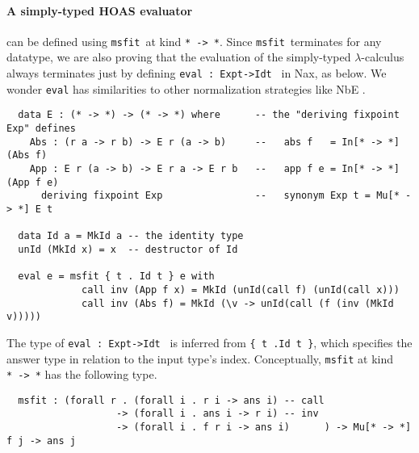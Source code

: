 \documentclass[a4paper]{easychair} %
\newcommand{\msfit}[0]{\texttt{msfit}}
\begin{document}
\paragraph{A simply-typed HOAS evaluator\!\!\!} can be defined
using \msfit\ at kind \texttt{*\,->\,*}.  Since \msfit\ terminates
for any datatype, we are also proving that the evaluation of
the simply-typed $\lambda$-calculus always terminates
just by defining \texttt{eval\,:\,Exp\;t\;->\;Id\;t\,} in Nax, as below.
We wonder \texttt{eval} has similarities to other normalization strategies
like NbE \cite{BerSch91}.
\vspace*{-1ex}
{\small
\begin{verbatim}
  data E : (* -> *) -> (* -> *) where      -- the "deriving fixpoint Exp" defines
    Abs : (r a -> r b) -> E r (a -> b)     --   abs f   = In[* -> *] (Abs f)
    App : E r (a -> b) -> E r a -> E r b   --   app f e = In[* -> *] (App f e)
      deriving fixpoint Exp                --   synonym Exp t = Mu[* -> *] E t

  data Id a = MkId a -- the identity type
  unId (MkId x) = x  -- destructor of Id
  
  eval e = msfit { t . Id t } e with
             call inv (App f x) = MkId (unId(call f) (unId(call x)))
             call inv (Abs f) = MkId (\v -> unId(call (f (inv (MkId v)))))
\end{verbatim} }
\vspace*{-.5ex}\noindent
The type of \texttt{eval\,:\,Exp\;t\;->\;Id\;t\,} is inferred from
\texttt{\{\,t\,.\;Id t\,\}}, which specifies the answer type in relation
to the input type's index.
Conceptually, \texttt{msfit} at kind \texttt{*\,->\,*} has the following type.\vspace*{-.5ex}
{\small
\begin{verbatim}
  msfit : (forall r . (forall i . r i -> ans i) -- call
                   -> (forall i . ans i -> r i) -- inv
                   -> (forall i . f r i -> ans i)      ) -> Mu[* -> *] f j -> ans j
\end{verbatim} }
\vspace*{-2.5ex}
\end{document}
